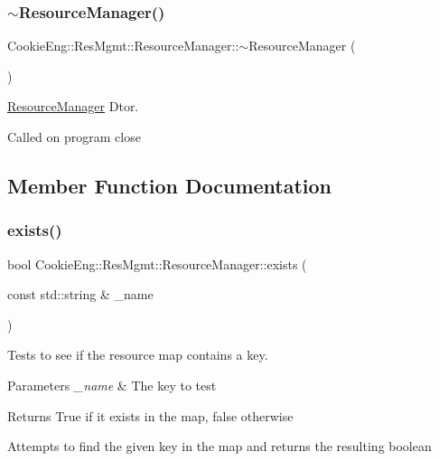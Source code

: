 \subsubsection{\texorpdfstring{$\sim$\+Resource\+Manager()}{~ResourceManager()}}
{\footnotesize\ttfamily Cookie\+Eng\+::\+Res\+Mgmt\+::\+Resource\+Manager\+::$\sim$\+Resource\+Manager (\begin{DoxyParamCaption}{ }\end{DoxyParamCaption})\hspace{0.3cm}{\ttfamily [protected]}}



\hyperlink{class_cookie_eng_1_1_res_mgmt_1_1_resource_manager}{Resource\+Manager} Dtor. 

Called on program close 

\subsection{Member Function Documentation}
\mbox{\label{class_cookie_eng_1_1_res_mgmt_1_1_resource_manager_a8622e0f345edf02dc21c5e460049f130}} 
\subsubsection{\texorpdfstring{exists()}{exists()}}
{\footnotesize\ttfamily bool Cookie\+Eng\+::\+Res\+Mgmt\+::\+Resource\+Manager\+::exists (\begin{DoxyParamCaption}\item[{const std\+::string \&}]{\+\_\+name }\end{DoxyParamCaption})}



Tests to see if the resource map contains a key. 


\begin{DoxyParams}{Parameters}
{\em \+\_\+name} & The key to test \\
\hline
\end{DoxyParams}
\begin{DoxyReturn}{Returns}
True if it exists in the map, false otherwise
\end{DoxyReturn}
Attempts to find the given key in the map and returns the resulting boolean \mbox{\label{class_cookie_eng_1_1_res_mgmt_1_1_resource_manager_adac3f1571c17315a1dc40d2f86425763}} 
